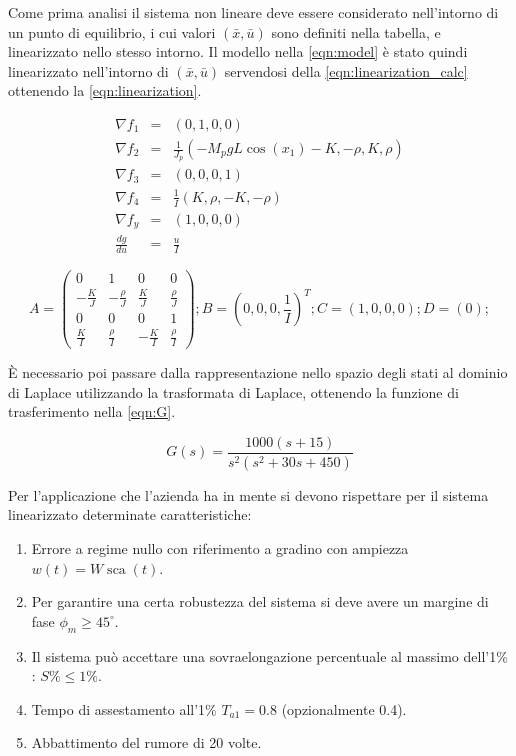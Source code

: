 \documentclass[a4paper]{article}
\DeclareMathOperator*{\sca}{\textrm{sca}}
\begin{document}
Come prima analisi il sistema non lineare deve essere considerato nell’intorno di un punto di equilibrio, i cui valori $(\bar{x}, \bar{u})$ sono definiti nella tabella, e linearizzato nello stesso intorno.
Il modello nella \cref{eqn:model} è stato quindi linearizzato nell’intorno di $(\bar{x}, \bar{u})$ servendosi della \cref{eqn:linearization_calc} ottenendo la \cref{eqn:linearization}.

\begin{equation}
    \label{eqn:linearization_calc}
    \begin{array}{rcl}   
        \nabla f_1 & = &(0, 1, 0, 0) \\
        \nabla f_2 & = &\frac{1}{J_p} (-M_p g L \cos(x_1) - K, - \rho, K, \rho) \\
        \nabla f_3 & = & (0, 0, 0, 1)\\
        \nabla f_4 & = & \frac{1}{I} (K, \rho, -K, -\rho) \\
        \nabla f_y & = & (1, 0, 0, 0)  \\
        \frac{dg}{du} & = & \frac{u}{I}
    \end{array}
\end{equation}

\begin{equation}
    \label{eqn:linearization}
A = \begin{pmatrix}0 & 1 & 0 & 0 \\
    -\frac{K}{J} & -\frac {\rho}{J} & \frac{K}{J} & \frac{\rho}{J} \\
    0    &   0    &   0    &   1\\
    \frac{K}{I} & \frac{\rho}{I} & -\frac{K}{I} & \frac{\rho}{I}
\end{pmatrix};
B = (0, 0, 0, \frac{1}{I})^T;
C = (1, 0, 0, 0);
D = (0);
\end{equation}

È necessario poi passare dalla rappresentazione nello spazio degli stati al dominio di Laplace utilizzando la trasformata di Laplace, ottenendo la funzione di trasferimento nella \cref{eqn:G}.

\begin{equation}
    \label{eqn:G}
    G(s) = \frac{1000 (s+15)}{s^2 (s^2 + 30s + 450)}
\end{equation}

Per l’applicazione che l’azienda ha in mente si devono rispettare per il sistema linearizzato determinate caratteristiche:
\begin{enumerate}
    \item Errore a regime nullo con riferimento a gradino con ampiezza $w(t) = W \sca(t)$.
    \item Per garantire una certa robustezza del sistema si deve avere un margine di fase $\phi_m \geq 45^\circ$.
    \item Il sistema può accettare una sovraelongazione percentuale al massimo dell’1\% : $S\% \leq 1\%$.
    \item Tempo di assestamento all'1\% $T_{a1} = 0.8$ (opzionalmente 0.4).
    \item Abbattimento del rumore di 20 volte.
\end{enumerate}
\end{document}
